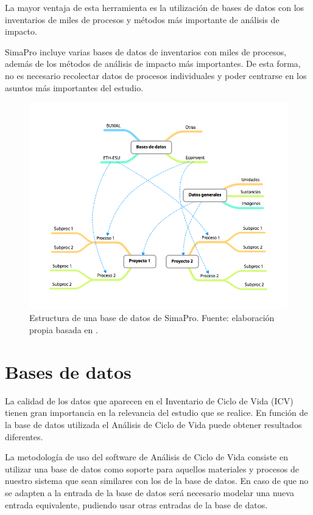 La mayor ventaja de esta herramienta es la utilización de bases de datos con los inventarios de miles de procesos y métodos más importante de análisis de impacto.

SimaPro incluye varias bases de datos de inventarios con miles de procesos, además de los métodos de análisis de impacto más importantes. De esta forma, no es necesario recolectar datos de procesos individuales y poder centrarse en los asuntos más importantes del estudio.

\begin{figure}[!htb]
\centering
\includegraphics[width=15cm]{img/bbddsimapro.png}
\caption[Estructura de una base de datos de SimaPro.]{Estructura de una base de datos de SimaPro. Fuente: elaboración propia basada en \protect\cite{mgoedkoop3}.}
\label{fig:bbddsimapro}
\end{figure}

\section{Bases de datos}

La calidad de los datos que aparecen en el Inventario de Ciclo de Vida (ICV) tienen gran importancia en la relevancia del estudio que se realice. En función de la base de datos utilizada el Análisis de Ciclo de Vida puede obtener resultados diferentes.

La metodología de uso del software de Análisis de Ciclo de Vida consiste en utilizar una base de datos como soporte para aquellos materiales y procesos de nuestro sistema que sean similares con los de la base de datos. En caso de que no se adapten a la entrada de la base de datos será necesario modelar una nueva entrada equivalente, pudiendo usar otras entradas de la base de datos.


